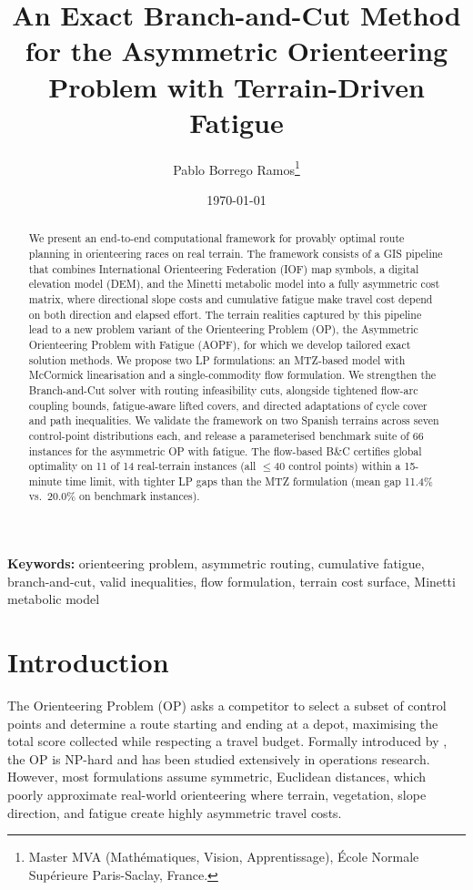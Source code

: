 \documentclass[11pt,a4paper]{article}
\title{An Exact Branch-and-Cut Method for the Asymmetric Orienteering Problem with Terrain-Driven Fatigue}
\author{
  Pablo Borrego Ramos\thanks{Master MVA (Math\'ematiques, Vision, Apprentissage), \'Ecole Normale Sup\'erieure Paris-Saclay, France.}
}
\date{\today}
\begin{document}
\maketitle

\begin{abstract}
We present an end-to-end computational framework for provably optimal route planning in orienteering races on real terrain.
The framework consists of a GIS pipeline that combines International Orienteering Federation (IOF) map symbols, a digital elevation model (DEM), and the Minetti metabolic model into a fully asymmetric cost matrix, where directional slope costs and cumulative fatigue make travel cost depend on both direction and elapsed effort.
The terrain realities captured by this pipeline lead to a new problem variant of the Orienteering Problem (OP), the Asymmetric Orienteering Problem with Fatigue (AOPF), for which we develop tailored exact solution methods.
We propose two LP formulations: an MTZ-based model with McCormick linearisation and a single-commodity flow formulation.
We strengthen the Branch-and-Cut solver with routing infeasibility cuts, alongside tightened flow-arc coupling bounds, fatigue-aware lifted covers, and directed adaptations of cycle cover and path inequalities.
We validate the framework on two Spanish terrains across seven control-point distributions each, and release a parameterised benchmark suite of 66 instances for the asymmetric OP with fatigue.
The flow-based B\&C certifies global optimality on 11 of 14 real-terrain instances (all $\leq 40$ control points) within a 15-minute time limit, with tighter LP gaps than the MTZ formulation (mean gap 11.4\% vs.\ 20.0\% on benchmark instances).
\end{abstract}

\noindent\textbf{Keywords:} orienteering problem, asymmetric routing, cumulative fatigue, branch-and-cut, valid inequalities, flow formulation, terrain cost surface, Minetti metabolic model

\section{Introduction}
\label{sec:intro}

The Orienteering Problem (OP) asks a competitor to select a subset of control points and determine a route starting and ending at a depot, maximising the total score collected while respecting a travel budget.
Formally introduced by \citet{tsiligirides1984heuristic}, the OP is NP-hard and has been studied extensively in operations research.
However, most formulations assume symmetric, Euclidean distances, which poorly approximate real-world orienteering where terrain, vegetation, slope direction, and fatigue create highly asymmetric travel costs.
\end{document}
